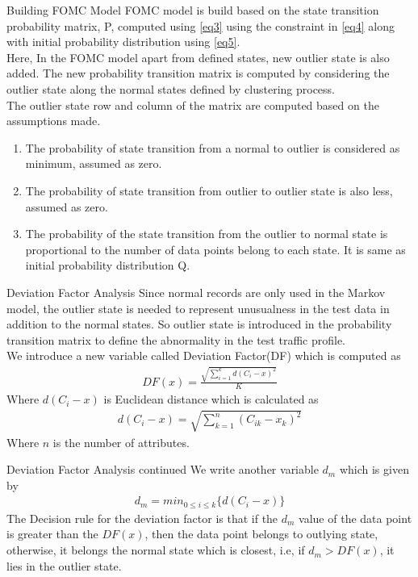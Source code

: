 \documentclass{beamer}
\begin{document}
\begin{frame}{Building FOMC Model}
FOMC model is build based on the state transition probability matrix, P, computed using \eqref{eq3} using the constraint in \eqref{eq4} along with initial probability distribution using \eqref{eq5}.\\
Here, In the FOMC model apart from defined states, new outlier state is also added. The new probability transition matrix is computed by considering the outlier state along the normal states defined by clustering process. \\
The outlier state row and column of the matrix are computed based on the assumptions made.
\begin{enumerate}
    \item The probability of state transition from a normal to outlier is considered as minimum, assumed as zero.
    \item The probability of state transition from outlier to outlier state is also less, assumed as zero.
    \item The probability of the state transition from the outlier to normal state is proportional to the number of data points belong to each state. It is same as initial probability distribution Q.
\end{enumerate}

\end{frame}

\begin{frame}{Deviation Factor Analysis}
Since normal records are only used in the Markov model, the outlier state is needed to represent unusualness in the test data in addition to the normal states.
So outlier state is introduced in the probability transition matrix to define the abnormality in the test traffic profile.\\
We introduce a new variable called Deviation Factor(DF) which is computed as
\begin{align}
    DF(x)=\frac{\sqrt{\sum_{i=1}^k d(C_i-x)^2}}{K}
\end{align}
Where $d(C_i-x)$ is Euclidean distance which is calculated as
\begin{align}
    d(C_i-x)=\sqrt{\sum_{k=1}^n(C_{ik}-x_k)^2}
\end{align}
Where $n$ is the number of attributes.
\end{frame}
\begin{frame}{Deviation Factor Analysis continued}
    We write another variable $d_m$ which is given by
\begin{align}
    d_m=min_{0\leq i\leq k}\{d(C_i-x)\}
\end{align}
The Decision rule for the deviation factor is that if the $d_m$ value of the data point is greater than the $DF(x)$, then the data point belongs to outlying state, otherwise, it belongs the normal state which is closest, i.e, if $d_m >DF(x)$, it lies in the outlier state.
\end{frame}
\end{document}
